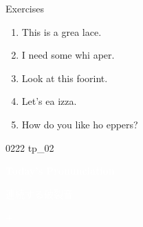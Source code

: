 \documentclass[aspectratio=169,xcolor={dvipsnames,table}]{beamer}
\begin{document}
\begin{frame}[plain]{Exercises }
  \Large
  \begin{enumerate}
    \item<2-> This is a grea  lace.
    \item<4-> I need some whi  aper.
    \item<6-> Look at this foorint.
    \item<8-> Let's ea  izza.
    \item<10-> How do you like ho  eppers?
  \end{enumerate}

  \hfill{\tiny 0222}\,{\scriptsize {}\,tp\_02}

\end{frame}
\begin{frame}
  \centering
  \textcolor{white}{\Huge\bfseries Today's Pronunciation}

  \vspace{30pt}

  \textcolor{white}{\Large 連続する破裂音}

  \textcolor{white}{\Large {} $+$ }

\end{frame}
\end{document}
